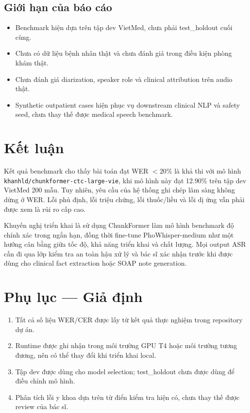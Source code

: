 \documentclass[12pt,a4paper]{article}
\begin{document}
\subsection{Giới hạn của báo cáo}

\begin{itemize}[leftmargin=1.2cm]
    \item Benchmark hiện dựa trên tập dev VietMed, chưa phải test\_holdout cuối cùng.
    \item Chưa có dữ liệu bệnh nhân thật và chưa đánh giá trong điều kiện phòng khám thật.
    \item Chưa đánh giá diarization, speaker role và clinical attribution trên audio thật.
    \item Synthetic outpatient cases hiện phục vụ downstream clinical NLP và safety seed, chưa thay thế được medical speech benchmark.
\end{itemize}

\section{Kết luận}

Kết quả benchmark cho thấy bài toán đạt WER $<20\%$ là khả thi với mô hình \texttt{khanhld/chunkformer-ctc-large-vie}, khi mô hình này đạt 12.90\% trên tập dev VietMed 200 mẫu. Tuy nhiên, yêu cầu của hệ thống ghi chép lâm sàng không dừng ở WER. Lỗi phủ định, lỗi triệu chứng, lỗi thuốc/liều và lỗi dị ứng vẫn phải được xem là rủi ro cấp cao.

Khuyến nghị triển khai là sử dụng ChunkFormer làm mô hình benchmark độ chính xác trong ngắn hạn, đồng thời fine-tune PhoWhisper-medium như một hướng cân bằng giữa tốc độ, khả năng triển khai và chất lượng. Mọi output ASR cần đi qua lớp kiểm tra an toàn hậu xử lý và bác sĩ xác nhận trước khi được dùng cho clinical fact extraction hoặc SOAP note generation.

\section{Phụ lục — Giả định}

\begin{enumerate}[leftmargin=1.2cm]
    \item Tất cả số liệu WER/CER được lấy từ kết quả thực nghiệm trong repository dự án.
    \item Runtime được ghi nhận trong môi trường GPU T4 hoặc môi trường tương đương, nên có thể thay đổi khi triển khai local.
    \item Tập dev được dùng cho model selection; test\_holdout chưa được dùng để điều chỉnh mô hình.
    \item Phân tích lỗi y khoa dựa trên từ điển kiểm tra hiện có, chưa thay thế được review của bác sĩ.
\end{enumerate}
\end{document}

